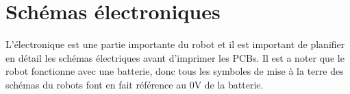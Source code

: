 \chapter{Schémas électroniques}

L'électronique est une partie importante du robot et il est important de planifier en détail les schémas électriques avant d'imprimer les PCBs. Il est a noter que le robot fonctionne avec une batterie, donc tous les symboles de mise à la terre des schémas du robots font en fait référence au 0V de la batterie.






